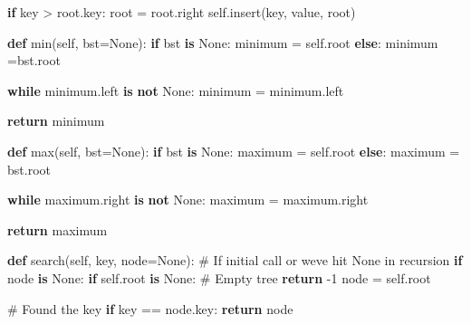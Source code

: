 \documentclass[
  nswissgerman,
  a4paper,
  DIV=11,
  numbers=noendperiod,
  ngerman]{scrreprt}
\newenvironment{Shaded}{\begin{snugshade}}{\end{snugshade}}
\newcommand{\BuiltInTok}[1]{\textcolor[rgb]{0.00,0.23,0.31}{#1}}
\newcommand{\CommentTok}[1]{\textcolor[rgb]{0.37,0.37,0.37}{#1}}
\newcommand{\ControlFlowTok}[1]{\textcolor[rgb]{0.00,0.23,0.31}{\textbf{#1}}}
\newcommand{\DecValTok}[1]{\textcolor[rgb]{0.68,0.00,0.00}{#1}}
\newcommand{\KeywordTok}[1]{\textcolor[rgb]{0.00,0.23,0.31}{\textbf{#1}}}
\newcommand{\NormalTok}[1]{\textcolor[rgb]{0.00,0.23,0.31}{#1}}
\newcommand{\OperatorTok}[1]{\textcolor[rgb]{0.37,0.37,0.37}{#1}}
\newcommand{\VariableTok}[1]{\textcolor[rgb]{0.07,0.07,0.07}{#1}}
\begin{document}
\begin{Shaded}
\begin{Highlighting}[numbers=left,,]
        \ControlFlowTok{if}\NormalTok{ key }\OperatorTok{\textgreater{}}\NormalTok{ root.key:}
\NormalTok{            root }\OperatorTok{=}\NormalTok{ root.right}
            \VariableTok{self}\NormalTok{.insert(key, value, root)}

    \KeywordTok{def} \BuiltInTok{min}\NormalTok{(}\VariableTok{self}\NormalTok{, bst}\OperatorTok{=}\VariableTok{None}\NormalTok{):}
        \ControlFlowTok{if}\NormalTok{ bst }\KeywordTok{is} \VariableTok{None}\NormalTok{:}
\NormalTok{            minimum }\OperatorTok{=} \VariableTok{self}\NormalTok{.root}
        \ControlFlowTok{else}\NormalTok{:}
\NormalTok{            minimum }\OperatorTok{=}\NormalTok{bst.root}
        
        \ControlFlowTok{while}\NormalTok{ minimum.left }\KeywordTok{is} \KeywordTok{not} \VariableTok{None}\NormalTok{:}
\NormalTok{            minimum }\OperatorTok{=}\NormalTok{ minimum.left}
        
        \ControlFlowTok{return}\NormalTok{ minimum}

    \KeywordTok{def} \BuiltInTok{max}\NormalTok{(}\VariableTok{self}\NormalTok{, bst}\OperatorTok{=}\VariableTok{None}\NormalTok{):}
        \ControlFlowTok{if}\NormalTok{ bst }\KeywordTok{is} \VariableTok{None}\NormalTok{:}
\NormalTok{            maximum }\OperatorTok{=} \VariableTok{self}\NormalTok{.root}
        \ControlFlowTok{else}\NormalTok{:}
\NormalTok{            maximum }\OperatorTok{=}\NormalTok{ bst.root}

        \ControlFlowTok{while}\NormalTok{ maximum.right }\KeywordTok{is} \KeywordTok{not} \VariableTok{None}\NormalTok{:}
\NormalTok{            maximum }\OperatorTok{=}\NormalTok{ maximum.right}

        \ControlFlowTok{return}\NormalTok{ maximum}

    \KeywordTok{def}\NormalTok{ search(}\VariableTok{self}\NormalTok{, key, node}\OperatorTok{=}\VariableTok{None}\NormalTok{):}
        \CommentTok{\# If initial call or we\textquotesingle{}ve hit None in recursion}
        \ControlFlowTok{if}\NormalTok{ node }\KeywordTok{is} \VariableTok{None}\NormalTok{:}
            \ControlFlowTok{if} \VariableTok{self}\NormalTok{.root }\KeywordTok{is} \VariableTok{None}\NormalTok{:  }\CommentTok{\# Empty tree}
                \ControlFlowTok{return} \OperatorTok{{-}}\DecValTok{1}
\NormalTok{            node }\OperatorTok{=} \VariableTok{self}\NormalTok{.root}
        
        \CommentTok{\# Found the key}
        \ControlFlowTok{if}\NormalTok{ key }\OperatorTok{==}\NormalTok{ node.key:}
            \ControlFlowTok{return}\NormalTok{ node}
            

\end{Highlighting}
\end{Shaded}
\end{document}
